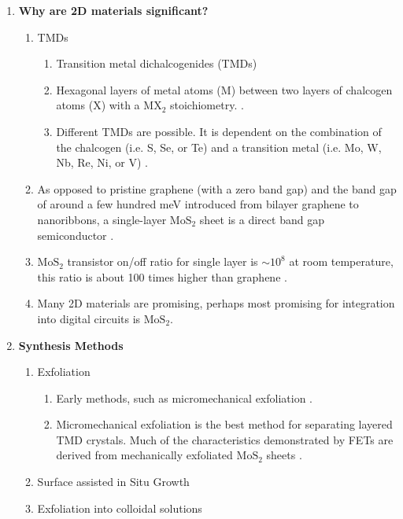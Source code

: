 \documentclass{article}
\begin{document}
\begin{enumerate}
\begin{enumerate}
		\end{enumerate} %
	\item{\textbf{Why are 2D materials significant?}}

		\begin{enumerate} %
			\item{TMDs}
				\begin{enumerate}
					\item{Transition metal dichalcogenides (TMDs)}
					\item{Hexagonal layers of metal atoms ($\mathrm{M}$) between two layers of chalcogen atoms ($\mathrm{X}$) with a $\mathrm{MX}_2$ stoichiometry. \cite{grapheneLike2Dreview2013}.}
					\item{Different TMDs are possible. It is dependent on the combination of the chalcogen (i.e. S, Se, or Te) and a transition metal (i.e. Mo, W, Nb, Re, Ni, or V) \cite{WilsonTMDs1969, grapheneLike2Dreview2013}.}
				\end{enumerate}
	
			\item{As opposed to pristine graphene (with a zero band gap) and the band gap of around a few hundred meV introduced from bilayer graphene to nanoribbons, a single-layer $\mathrm{MoS}_2$ sheet is a direct band gap semiconductor \cite{grapheneLike2Dreview2013}. }
			\item{$\mathrm{MoS}_2$ transistor on/off ratio for single layer is $\sim 10^8$ at room temperature, this ratio is about 100 times higher than graphene \cite{grapheneLike2Dreview2013, novoselovEtAl2004}.}
			\item{Many 2D materials are promising, perhaps most promising for integration into digital circuits is $\mathrm{MoS}_2$.}

		\end{enumerate} %

	\item{\textbf{Synthesis Methods}}
		\begin{enumerate} %
			\item{Exfoliation}
				\begin{enumerate}
					\item{Early methods, such as micromechanical exfoliation \cite{nanoscaleReview2011,acsnanoReview2013}.}
					\item{Micromechanical exfoliation is the best method for separating layered TMD crystals. Much of the characteristics demonstrated by FETs are derived from mechanically exfoliated $\mathrm{MoS}_2$ sheets \cite{grapheneLike2Dreview2013}.}
				\end{enumerate}
			\item{Surface assisted in Situ Growth}
			\item{Exfoliation into colloidal solutions}
		\end{enumerate} %


\end{enumerate}
\end{document}
